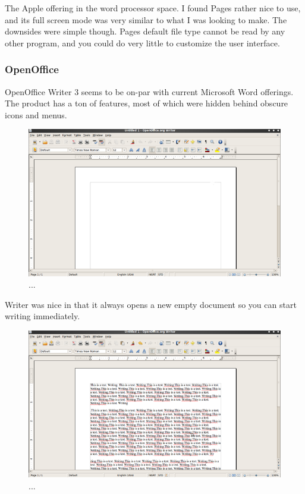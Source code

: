 \documentclass[10pt]{article}
\begin{document}
The Apple offering in the word processor space. I found Pages rather nice to use, and its full screen mode was very similar to what I was looking to make. The downsides were simple though. Pages default file type cannot be read by any other program, and you could do very little to customize the user interface.

\subsubsection{OpenOffice}

OpenOffice Writer 3 seems to be on-par with current Microsoft Word offerings. The product has a ton of features, most of which were hidden behind obscure icons and menus.

\begin{figure}
   \centering
      \includegraphics[width=130mm]{images/oo1.png}
   \caption{...}
\end{figure}

Writer was nice in that it always opens a new empty document so you can start writing immediately.

\begin{figure}
   \centering
      \includegraphics[width=130mm]{images/oo2.png}
   \caption{...}
\end{figure}
\end{document}
